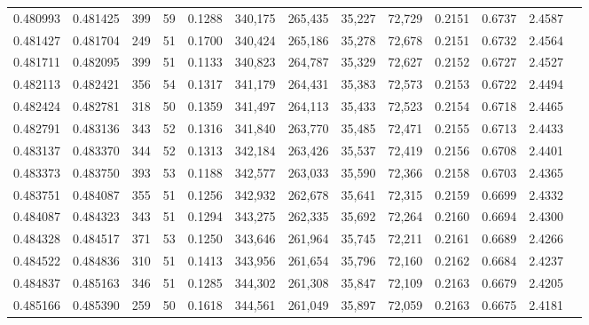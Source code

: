 \begin{tabular}{rrrrrrrrrrrrr}
0.480993 & 0.481425 &   399 &  59 &                                     0.1288 & 340,175 & 265,435 &  35,227 &  72,729 & 0.2151 & 0.6737 & 2.4587 \\
0.481427 & 0.481704 &   249 &  51 &                                     0.1700 & 340,424 & 265,186 &  35,278 &  72,678 & 0.2151 & 0.6732 & 2.4564 \\
0.481711 & 0.482095 &   399 &  51 &                                     0.1133 & 340,823 & 264,787 &  35,329 &  72,627 & 0.2152 & 0.6727 & 2.4527 \\
0.482113 & 0.482421 &   356 &  54 &                                     0.1317 & 341,179 & 264,431 &  35,383 &  72,573 & 0.2153 & 0.6722 & 2.4494 \\
0.482424 & 0.482781 &   318 &  50 &                                     0.1359 & 341,497 & 264,113 &  35,433 &  72,523 & 0.2154 & 0.6718 & 2.4465 \\
0.482791 & 0.483136 &   343 &  52 &                                     0.1316 & 341,840 & 263,770 &  35,485 &  72,471 & 0.2155 & 0.6713 & 2.4433 \\
0.483137 & 0.483370 &   344 &  52 &                                     0.1313 & 342,184 & 263,426 &  35,537 &  72,419 & 0.2156 & 0.6708 & 2.4401 \\
0.483373 & 0.483750 &   393 &  53 &                                     0.1188 & 342,577 & 263,033 &  35,590 &  72,366 & 0.2158 & 0.6703 & 2.4365 \\
0.483751 & 0.484087 &   355 &  51 &                                     0.1256 & 342,932 & 262,678 &  35,641 &  72,315 & 0.2159 & 0.6699 & 2.4332 \\
0.484087 & 0.484323 &   343 &  51 &                                     0.1294 & 343,275 & 262,335 &  35,692 &  72,264 & 0.2160 & 0.6694 & 2.4300 \\
0.484328 & 0.484517 &   371 &  53 &                                     0.1250 & 343,646 & 261,964 &  35,745 &  72,211 & 0.2161 & 0.6689 & 2.4266 \\
0.484522 & 0.484836 &   310 &  51 &                                     0.1413 & 343,956 & 261,654 &  35,796 &  72,160 & 0.2162 & 0.6684 & 2.4237 \\
0.484837 & 0.485163 &   346 &  51 &                                     0.1285 & 344,302 & 261,308 &  35,847 &  72,109 & 0.2163 & 0.6679 & 2.4205 \\
0.485166 & 0.485390 &   259 &  50 &                                     0.1618 & 344,561 & 261,049 &  35,897 &  72,059 & 0.2163 & 0.6675 & 2.4181 \\

\end{tabular}
